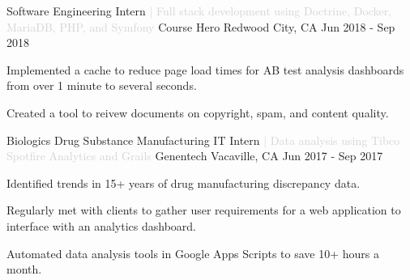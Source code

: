 

\begin{cventries}

  \cventry
  {Software Engineering Intern \textcolor{lightgray}{| Full stack development using Doctrine, Docker, MariaDB, PHP, and Symfony}}
  {Course Hero}
  {Redwood City, CA}
  {Jun 2018 - Sep 2018}
  {
  \begin{cvitems}
    \item {Implemented a cache to reduce page load times for AB test analysis dashboards from over 1 minute to several seconds.}
    \item {Created a tool to reivew documents on copyright, spam, and content quality.}
  \end{cvitems}
  }

  \cventry
  {Biologics Drug Substance Manufacturing IT Intern \textcolor{lightgray}{| Data analysis using Tibco Spotfire Analytics and Grails} } %
  {Genentech} %
  {Vacaville, CA} %
  {Jun 2017 - Sep 2017} %
  {
  \begin{cvitems} %
    \item {Identified trends in 15+ years of drug manufacturing discrepancy data.}
    \item {Regularly met with clients to gather user requirements for a web application to interface with an analytics dashboard.}
    \item {Automated data analysis tools in Google Apps Scripts to save 10+ hours a month.}
  \end{cvitems}
  }
\end{cventries}
